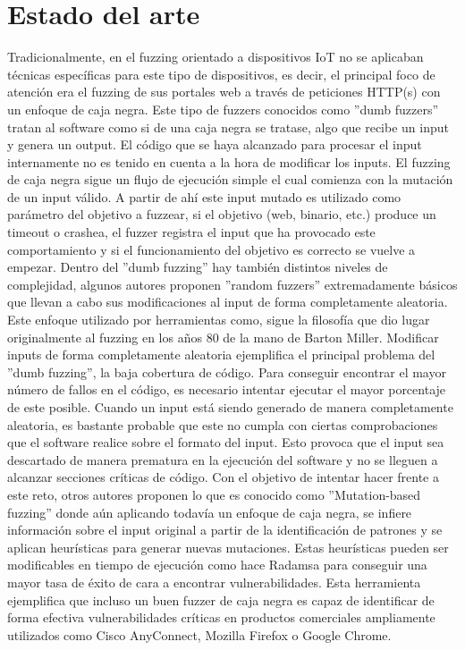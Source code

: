 \chapter{Estado del arte}
\label{estado_del_arte}
Tradicionalmente, en el fuzzing orientado a dispositivos IoT no se aplicaban técnicas
específicas para este tipo de dispositivos, es decir, el principal foco de atención era el fuzzing de sus portales web a través 
de peticiones HTTP(s) con un enfoque de caja negra. Este tipo de fuzzers conocidos como ''dumb fuzzers'' tratan al software como si de una caja negra se tratase, 
algo que recibe un input y genera un output. El código que se haya alcanzado para procesar el input internamente no es tenido en
cuenta a la hora de modificar los inputs. El fuzzing de caja negra sigue un flujo de ejecución simple el cual comienza con la mutación de un input válido.
A partir de ahí este input mutado es utilizado como parámetro del objetivo a fuzzear, si el 
objetivo (web, binario, etc.) produce un timeout o crashea, el fuzzer registra el input que 
ha provocado este comportamiento y si el funcionamiento del objetivo es correcto se vuelve a empezar. Dentro del ''dumb fuzzing'' hay también
distintos niveles de complejidad, algunos autores proponen ''random fuzzers'' extremadamente básicos que 
llevan a cabo sus modificaciones al input de forma completamente aleatoria. Este enfoque utilizado por 
herramientas como\cite{zzuf}, sigue la filosofía que dio lugar originalmente al fuzzing en 
los años 80 de la mano de Barton Miller\cite{Miller1990}. Modificar inputs de forma completamente aleatoria
ejemplifica el principal problema del ''dumb fuzzing'', la baja cobertura de código. Para conseguir encontrar 
el mayor número de fallos en el código, es necesario intentar ejecutar el mayor porcentaje de este posible. Cuando 
un input está siendo generado de manera completamente aleatoria, es bastante probable que este no cumpla con
ciertas comprobaciones que el software realice sobre el formato del input. Esto provoca que el input sea descartado 
de manera prematura en la ejecución del software y no se lleguen a alcanzar secciones críticas de código.
Con el objetivo de intentar hacer frente a este reto, otros autores proponen lo que es 
conocido como ''Mutation-based fuzzing'' donde aún aplicando todavía un enfoque de caja negra, se infiere
información sobre el input original a partir de la identificación de patrones y se aplican heurísticas para generar
nuevas mutaciones. Estas heurísticas pueden ser modificables en tiempo de ejecución como hace Radamsa\cite{radamsa}
para conseguir una mayor tasa de éxito de cara a encontrar vulnerabilidades. Esta herramienta ejemplifica que incluso 
un buen fuzzer de caja negra es capaz de identificar de forma efectiva vulnerabilidades críticas en productos comerciales 
ampliamente utilizados como Cisco AnyConnect, Mozilla Firefox o Google Chrome.

